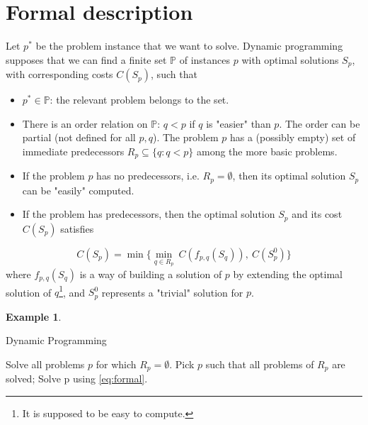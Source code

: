 \documentclass[12pt, openany]{report}
\theoremstyle{definition}
\newtheorem{ex}[thm]{Example}
\begin{document}
\section{Formal description}
Let $p^*$ be the problem instance that we want to solve. Dynamic programming supposes that we can find a finite set $\mathbb{P}$ of instances $p$ with optimal solutions $S_p$, with corresponding costs $C(S_p)$, such that 
\begin{itemize}
    \item $p^*\in \mathbb{P}$: the relevant problem belongs to the set.
    \item There is an order relation on $\mathbb{P}$: $q<p$ if $q$ is "easier" than $p$. The order can be partial (not defined for all $p,q$). The problem $p$ has a (possibly empty) set of immediate predecessors $R_p\subseteq \{q:q<p\}$ among the more basic problems.
    \item If the problem $p$ has no predecessors, i.e. $R_p=\emptyset$, then its optimal solution $S_p$ can be "easily" computed. 
    \item If the problem has predecessors, then the optimal solution $S_p$ and its cost $C(S_p)$ satisfies
\end{itemize}
\begin{equation}\label{eq:formal}
    C(S_p)=\min\{\min_{q\in R_p}\:C(f_{p,q}(S_q)),\:C(S_p^0)\}
\end{equation}
where $f_{p,q}(S_q)$ is a way of building a solution of $p$ by extending the optimal solution of $q$\footnote{It is supposed to be easy to compute.}, and $S_p^0$ represents a "trivial" solution for $p$. 
\begin{ex}
\end{ex}
\begin{algorithm}
    \caption{Dynamic Programming}\label{algo:dp}
    \begin{algorithmic}[1]
        Solve all problems $p$ for which $R_p=\emptyset$.
            \State Pick $p$ such that all problems of $R_p$ are solved;
            \State Solve p using \eqref{eq:formal}.
        \EndWhile
    \end{algorithmic}
\end{algorithm}
\end{document}
